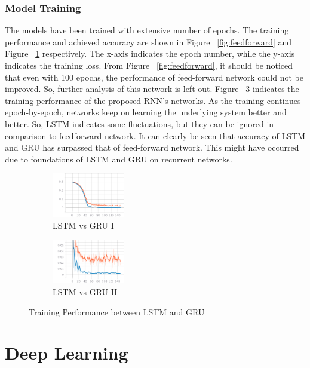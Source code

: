 \subsubsection{Model Training}

The models have been trained with extensive number of epochs. The training performance and achieved accuracy are shown in Figure ~\ref{fig:feedforward} and Figure ~\ref{fig:trg} respectively. The x-axis indicates the epoch number, while the y-axis indicates the training loss. From Figure ~\ref{fig:feedforward}, it should be noticed that even with 100 epochs, the performance of feed-forward network could not be improved. So, further analysis of this network is left out. Figure ~\ref{fig:train} indicates the training performance of the proposed RNN’s networks. As the training continues epoch-by-epoch, networks keep on learning the underlying system better and better. So, LSTM indicates some fluctuations, but they can be ignored in comparison to feedforward network. It can clearly be seen that accuracy of LSTM and GRU has surpassed that of feed-forward network. This might have occurred due to foundations of LSTM and GRU on recurrent networks. 

\begin{figure}[h!]
	\centering
	\begin{subfigure}{.5\textwidth}
		\includegraphics[width=0.35\textwidth]{fig/trg.png}
		\caption{LSTM vs GRU I}
		\label{fig:trg}
	\end{subfigure}%
	\begin{subfigure}{.5\textwidth}
			\centering
		\includegraphics[width=0.35\textwidth]{fig/train.png}
		\caption{LSTM vs GRU II}
		\label{fig:train}
	\end{subfigure}	
	\caption{Training Performance between LSTM and GRU}
\end{figure}


\section{Deep Learning}


